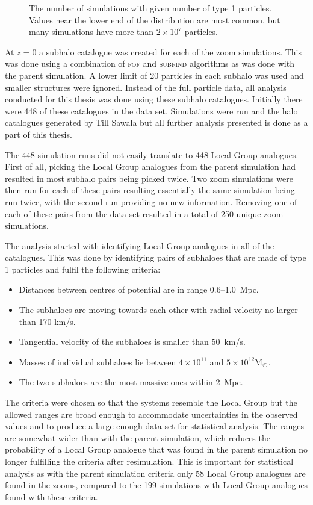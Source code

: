 \documentclass[english, twoside]{HYgradu}
\begin{document}
\begin{figure}
    \centering
    
    \caption{The number of simulations with given number of type 1 particles. Values near the lower end of the distribution are most common, but many simulations have more than $2 \times 10^7$ particles.}\label{fig:type1hist}
\end{figure}


At $z=0$ a subhalo catalogue was created for each of the zoom simulations. This was done using a combination of \textsc{fof} and \textsc{subfind} algorithms as was done with the parent simulation. A lower limit of 20 particles in each subhalo was used and smaller structures were ignored. Instead of the full particle data, all analysis conducted for this thesis was done using these subhalo catalogues. Initially there were 448 of these catalogues in the data set. Simulations were run and the halo catalogues generated by Till Sawala but all further analysis presented is done as a part of this thesis.

The 448 simulation runs did not easily translate to 448 Local Group analogues. First of all, picking the Local Group analogues from the parent simulation had resulted in most subhalo pairs being picked twice. Two zoom simulations were then run for each of these pairs resulting essentially the same simulation being run twice, with the second run providing no new information. Removing one of each of these pairs from the data set resulted in a total of 250 unique zoom simulations.

The analysis started with identifying Local Group analogues in all of the catalogues. This was done by identifying pairs of subhaloes that are made of type 1 particles and fulfil the following criteria:
\begin{itemize}
\item Distances between centres of potential are in range 0.6--1.0~Mpc.
\item The subhaloes are moving towards each other with radial velocity no larger than 170 km/s.
\item Tangential velocity of the subhaloes is smaller than 50~km/s.
\item Masses of individual subhaloes lie between $4 \times 10^{11}$ and $5 \times 10^{12} \mathrm{M_{\astrosun}}$.
\item The two subhaloes are the most massive ones within 2~Mpc.
\end{itemize}
The criteria were chosen so that the systems resemble the Local Group but the allowed ranges are broad enough to accommodate uncertainties in the observed values and to produce a large enough data set for statistical analysis. The ranges are somewhat wider than with the parent simulation, which reduces the probability of a Local Group analogue that was found in the parent simulation no longer fulfilling the criteria after resimulation. This is important for statistical analysis as with the parent simulation criteria only 58 Local Group analogues are found in the zooms, compared to the 199 simulations with Local Group analogues found with these criteria.
\end{document}
